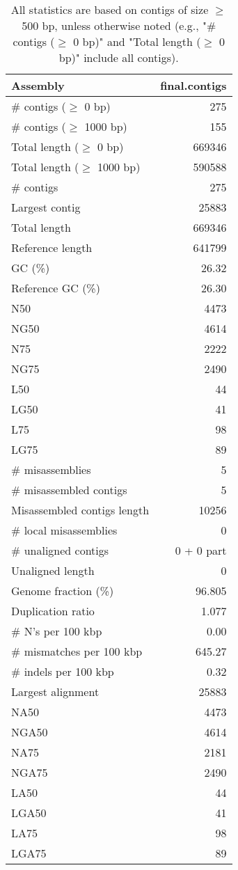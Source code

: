 \documentclass[12pt,a4paper]{article}
\begin{document}
\begin{table}[ht]
\begin{center}
\caption{All statistics are based on contigs of size $\geq$ 500 bp, unless otherwise noted (e.g., "\# contigs ($\geq$ 0 bp)" and "Total length ($\geq$ 0 bp)" include all contigs).}
\begin{tabular}{|l*{1}{|r}|}
\hline
Assembly & final.contigs \\ \hline
\# contigs ($\geq$ 0 bp) & 275 \\ \hline
\# contigs ($\geq$ 1000 bp) & 155 \\ \hline
Total length ($\geq$ 0 bp) & 669346 \\ \hline
Total length ($\geq$ 1000 bp) & 590588 \\ \hline
\# contigs & 275 \\ \hline
Largest contig & 25883 \\ \hline
Total length & 669346 \\ \hline
Reference length & 641799 \\ \hline
GC (\%) & 26.32 \\ \hline
Reference GC (\%) & 26.30 \\ \hline
N50 & 4473 \\ \hline
NG50 & 4614 \\ \hline
N75 & 2222 \\ \hline
NG75 & 2490 \\ \hline
L50 & 44 \\ \hline
LG50 & 41 \\ \hline
L75 & 98 \\ \hline
LG75 & 89 \\ \hline
\# misassemblies & 5 \\ \hline
\# misassembled contigs & 5 \\ \hline
Misassembled contigs length & 10256 \\ \hline
\# local misassemblies & 0 \\ \hline
\# unaligned contigs & 0 + 0 part \\ \hline
Unaligned length & 0 \\ \hline
Genome fraction (\%) & 96.805 \\ \hline
Duplication ratio & 1.077 \\ \hline
\# N's per 100 kbp & 0.00 \\ \hline
\# mismatches per 100 kbp & 645.27 \\ \hline
\# indels per 100 kbp & 0.32 \\ \hline
Largest alignment & 25883 \\ \hline
NA50 & 4473 \\ \hline
NGA50 & 4614 \\ \hline
NA75 & 2181 \\ \hline
NGA75 & 2490 \\ \hline
LA50 & 44 \\ \hline
LGA50 & 41 \\ \hline
LA75 & 98 \\ \hline
LGA75 & 89 \\ \hline
\end{tabular}
\end{center}
\end{table}
\end{document}
